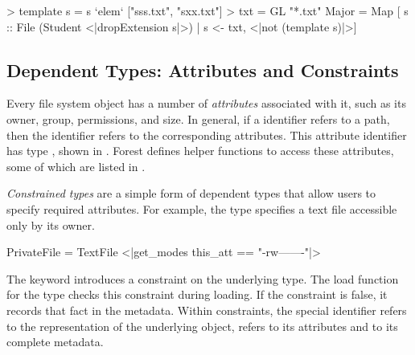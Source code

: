 \begin{code}
> template s = s `elem` ["sss.txt", "sxx.txt"]
> txt = GL "*.txt"
\mbox{}
 Major = Map
   [ s :: File (Student <|dropExtension s|>) 
   | s <-  txt, <|not (template s)|>]
\end{code}


\subsection{Dependent Types: Attributes and Constraints}
\label{sec:constraints}

Every file system object has a number of \textit{attributes} associated with
it, such as its owner, group, permissions, and size.  In general,
if a \forest{} identifier  refers to a path, 
then the identifier  refers to the
corresponding attributes.  This attribute identifier has type
, shown in . 
Forest defines
helper functions to access these attributes, some of which are listed
in .

\textit{Constrained types} are a simple form of dependent types that
allow users to specify required attributes. 
For example, the 
type  specifies a text file accessible only by its owner.
\begin{code}
 PrivateFile = TextFile 
       <|get_modes this_att == "-rw-------"|>
\end{code}
The keyword  introduces a constraint on the underlying type.
The load function for the type  checks this
constraint during loading.  
If the constraint is false, it records that fact in the metadata.
Within constraints, the special identifier  refers to the representation 
of the underlying object,  refers to its attributes and  
to its complete metadata.


